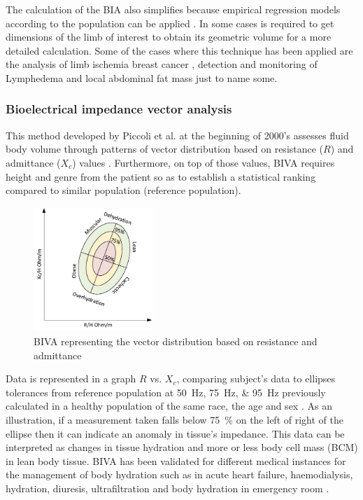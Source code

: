 The calculation of the BIA also simplifies because empirical regression models according to the population can be applied \cite{kyle2004bioelectrical}. In some cases is required to get dimensions of the limb of interest to obtain its geometric volume for a more detailed calculation.  Some of the cases where this technique has been applied are the analysis of limb ischemia \cite{songer2001tissue,kun1994tissue} breast cancer \cite{zou2003review}, detection and monitoring of Lymphedema \cite{vicini2012bioelectrical} and local abdominal fat mass \cite{scharfetter2001assessing} just to name some. 

\subsubsection{Bioelectrical impedance vector analysis}
This method developed by Piccoli et al. \cite{piccoli2000relationship, piccoli2002impedance} at the beginning of 2000’s assesses fluid body volume through patterns of vector distribution based on resistance ($R$) and admittance ($X_{c}$) values \cite{thomas2003comparison}. Furthermore, on top of those values, BIVA requires height and genre from the patient so as to establish a statistical ranking compared to similar population (reference population). 

\begin{figure}[!htpb]
	\centering
	\includegraphics[width=0.4\textwidth,keepaspectratio]{figure13}    
	\caption[BIVA representation]{BIVA representing the vector distribution based on resistance and admittance}
	\label{fig:BIVA plot}
\end{figure}

Data is represented in a graph $R$ vs. $X_{c}$, comparing subject’s data to ellipses tolerances from reference population at \SIlist{50;75;95}{\hertz} previously calculated in a healthy population of the same race, the age and sex \cite{kyle2004bioelectrical,piccoli2000relationship, piccoli2002impedance}. As an illustration, if a measurement taken falls below \SI{75}{\percent} on the left of right of the ellipse then it can indicate an anomaly in tissue’s impedance. This data can be interpreted as changes in tissue hydration and more or less body cell mass (BCM) in lean body tissue. BIVA has been validated for different medical instances for the management of body hydration such as in acute heart failure, haemodialysis, hydration, diuresis, ultrafiltration and body hydration in emergency room \cite{disomma2011consensus}. 

